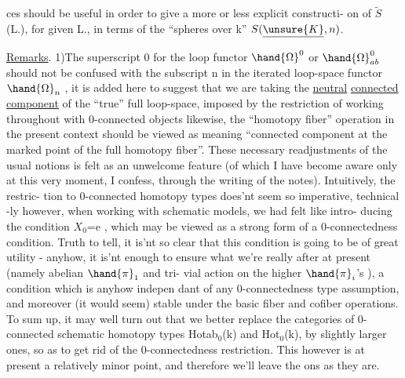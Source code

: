 
ces should be useful in order to give a more or less explicit constructi-%
on of $\tilde{S}$(L.), for given L., in terms of the ``spheres over k''  $S(\underline{\unsure{K}},n)$.

\uline{Remarks}. 1)The superscript 0 for the loop functor $\hand{\Omega}^{0}$ or $\hand{\Omega}^{0}_{ab}$ should
not be confused with the subscript n in the iterated loop-space functor
$\hand{\Omega}_n$ , it is  added here to suggest that we are taking the \uline{neutral}
\uline{connected component} of the ``true'' full loop-space,   imposed by the
restriction of working throughout with 0-connected objects\hand{;} \deleted{--} likewise,
the ``homotopy fiber'' operation in the present context should be viewed
as meaning ``connected component at the marked point of the full homotopy
fiber''. These necessary readjustments of the usual notions is  felt as an
unwelcome feature (of which I have become aware only at this very moment,
I confess, through the writing of the notes). Intuitively, the restric-%
tion to 0-connected  homotopy types does'nt seem so imperative, technical
-ly however, when working with  schematic models, we had felt like intro-%
ducing the condition $X_0$=e , which may be viewed as a strong form of a
0-connectedness condition. Truth to tell, it is'nt so clear that this
condition is  going to be of great utility - anyhow, it is'nt enough
to ensure what we're really after at present (namely abelian $\hand{\pi}_1$ and tri-%
vial action on the higher $\hand{\pi}_i$'s ), a condition which is anyhow indepen
dant of any 0-connectedness type assumption, and  moreover (it would
seem) stable under the basic fiber and cofiber operations. To sum up,
it may well turn out that we better replace the categories of 0-connected
schematic homotopy types Hotab$_0$(k) and Hot$_0$(k), by slightly larger ones,
so as to get rid of the 0-connectedness restriction. This however is at
present a relatively minor point, and therefore we'll leave the  
ons as they are.

